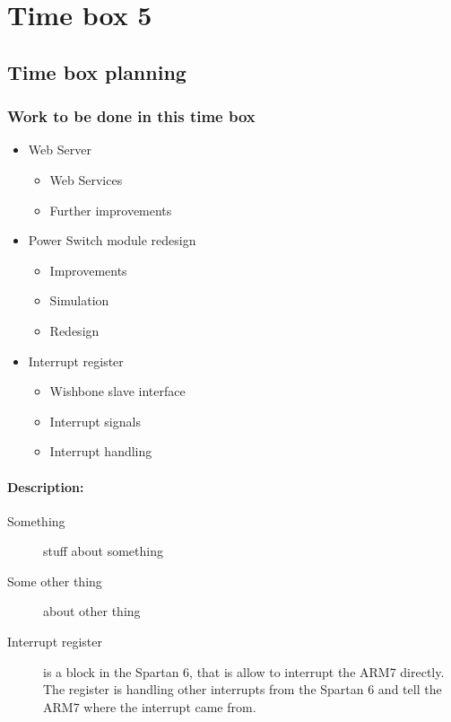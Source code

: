 \section{Time box 5} 
\listoftodos
\subsection{Time box planning}
\begin{figure}[H]
	\begin{centering}
	\end{centering}
\end{figure}
\subsubsection{Work to be done in this time box}
\begin{itemize}
	\item Web Server
	\begin{itemize}
		\item Web Services
		\item Further improvements
	\end{itemize}
	\item Power Switch module redesign
	\begin{itemize}
		\item Improvements
		\item Simulation
		\item Redesign
	\end{itemize}
	\item Interrupt register
	\begin{itemize}
		\item Wishbone slave interface
		\item Interrupt signals
		\item Interrupt handling
	\end{itemize}
\end{itemize}
\paragraph{Description:}
\begin{description}
	\item[Something] stuff about something
	\item[Some other thing] about other thing
	\item[Interrupt register] is a block in the Spartan 6, that is allow to interrupt the ARM7 directly. The register is handling other interrupts from the Spartan 6 and tell the ARM7 where the interrupt came from.
\end{description}
